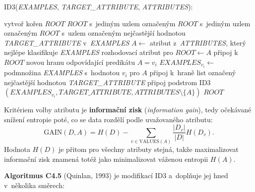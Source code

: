 \documentclass[11pt,a4paper]{article}
\theoremstyle{definition}
\begin{document}
\begin{defbox}
\textsc{ID3}(\emph{EXAMPLES}, \emph{TARGET\_ATTRIBUTE}, \emph{ATTRIBUTES}):
\begin{algorithmic}[1]
\State vytvoř kořen $\mathit{ROOT}$
 \Return $\mathit{ROOT}$ s~jediným uzlem
  označeným \uv{$+$} \EndIf
{} \Return $\mathit{ROOT}$ s~jediným uzlem
  označeným \uv{$-$} \EndIf
{} \Return $\mathit{ROOT}$ s~uzlem označeným
  nejčastější hodnotou \emph{TARGET\_ATTRIBUTE} v~\emph{EXAMPLES} \EndIf
\State $A\gets$ atribut z~\emph{ATTRIBUTES}, který nejlépe klasifikuje \emph{EXAMPLES}
\State rozhodovací atribut pro $\mathit{ROOT}\gets A$
   \State připoj k~$\mathit{ROOT}$ novou hranu odpovídající predikátu $A=v_i$
   \State $\mathit{EXAMPLES}_{v_i}\gets$ podmnožina \emph{EXAMPLES} s~hodnotou $v_i$ pro $A$
      \State připoj k~hraně list označený nejčastější hodnotou \emph{TARGET\_ATTRIBUTE}
   \Else
      \State připoj podstrom \textsc{ID3}$(\mathit{EXAMPLES}_{v_i},
             \mathit{TARGET\_ATTRIBUTE}, \mathit{ATTRIBUTES}\setminus\{A\})$
   \EndIf
\EndFor
\State \Return $\mathit{ROOT}$
\end{algorithmic}

Kritériem volby atributu je \textbf{informační zisk} (\emph{information gain}), tedy očekávané
snížení entropie poté, co se data rozdělí podle uvažovaného atributu:
\[ \mathrm{GAIN}(D,A)=H(D)-\sum_{v\in \mathrm{VALUES}(A)}\frac{|D_v|}{|D|}H(D_v). \]
Hodnota $H(D)$ je přitom pro všechny atributy stejná, takže maximalizovat informační zisk
znamená totéž jako minimalizovat váženou entropii $H(A)$.
\end{defbox}

\textbf{Algoritmus C4.5} (Quinlan, 1993) je modifikací ID3 a~doplňuje jej hned v~několika
směrech:
\end{document}
